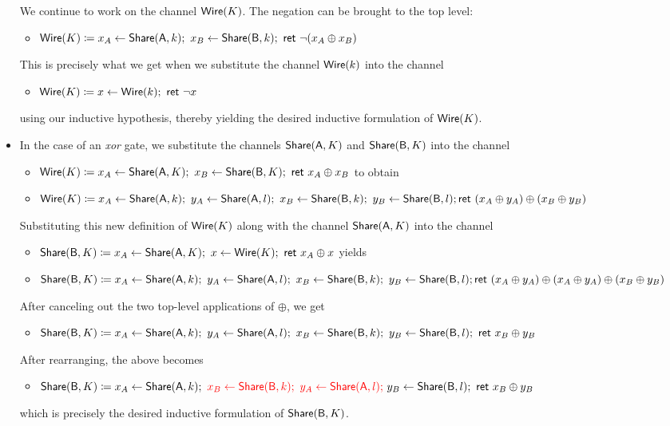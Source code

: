 \begin{itemize}
We continue to work on the channel $\mathsf{Wire}(K)$. The negation can be brought to the top level:
\begin{itemize}
\item $\mathsf{Wire}(K) \coloneqq x_A \leftarrow \mathsf{Share}(\mathsf{A},k); \ x_B \leftarrow \mathsf{Share}(\mathsf{B},k); \ \mathsf{ret} \ \neg (x_A \oplus x_B)$
\end{itemize}
This is precisely what we get when we substitute the channel $\mathsf{Wire}(k)$ into the channel
\begin{itemize}
\item $\mathsf{Wire}(K) \coloneqq x \leftarrow \mathsf{Wire}(k); \ \mathsf{ret} \ \neg x$
\end{itemize}
using our inductive hypothesis, thereby yielding the desired inductive formulation of $\mathsf{Wire}(K)$.
\item In the case of an \emph{xor} gate, we substitute the channels $\mathsf{Share}(\mathsf{A},K)$ and $\mathsf{Share}(\mathsf{B},K)$ into the channel
\begin{itemize}
\item $\mathsf{Wire}(K) \coloneqq x_A \leftarrow \mathsf{Share}(\mathsf{A},K); \ x_B \leftarrow \mathsf{Share}(\mathsf{B},K); \ \mathsf{ret} \ x_A \oplus x_B$ to obtain  
\item $\mathsf{Wire}(K) \coloneqq x_A \leftarrow \mathsf{Share}(\mathsf{A},k); \ y_A \leftarrow \mathsf{Share}(\mathsf{A},l); \ x_B \leftarrow \mathsf{Share}(\mathsf{B},k); \ y_B \leftarrow \mathsf{Share}(\mathsf{B},l); \\ \mathsf{ret} \ (x_A \oplus y_A) \oplus (x_B \oplus y_B)$
\end{itemize}
Substituting this new definition of $\mathsf{Wire}(K)$ along with the channel $\mathsf{Share}(\mathsf{A},K)$ into the channel
\begin{itemize}
\item $\mathsf{Share}(\mathsf{B},K) \coloneqq x_A \leftarrow \mathsf{Share}(\mathsf{A},K); \ x \leftarrow \mathsf{Wire}(K); \ \mathsf{ret} \ x_A \oplus x$ yields
\item $\mathsf{Share}(\mathsf{B},K) \coloneqq x_A \leftarrow \mathsf{Share}(\mathsf{A},k); \ y_A \leftarrow \mathsf{Share}(\mathsf{A},l); \ x_B \leftarrow \mathsf{Share}(\mathsf{B},k); \ y_B \leftarrow \mathsf{Share}(\mathsf{B},l); \\ \mathsf{ret} \ (x_A \oplus y_A) \oplus (x_A \oplus y_A) \oplus (x_B \oplus y_B)$
\end{itemize}
After canceling out the two top-level applications of $\oplus$, we get
\begin{itemize}
\item $\mathsf{Share}(\mathsf{B},K) \coloneqq x_A \leftarrow \mathsf{Share}(\mathsf{A},k); \ y_A \leftarrow \mathsf{Share}(\mathsf{A},l); \ x_B \leftarrow \mathsf{Share}(\mathsf{B},k); \ y_B \leftarrow \mathsf{Share}(\mathsf{B},l); \ \mathsf{ret} \ x_B \oplus y_B$
\end{itemize}
After rearranging, the above becomes
\begin{itemize}
\item $\mathsf{Share}(\mathsf{B},K) \coloneqq x_A \leftarrow \mathsf{Share}(\mathsf{A},k); \ {\color{red} x_B \leftarrow \mathsf{Share}(\mathsf{B},k); \ y_A \leftarrow \mathsf{Share}(\mathsf{A},l); \ } y_B \leftarrow \mathsf{Share}(\mathsf{B},l); \ \mathsf{ret} \ x_B \oplus y_B$
\end{itemize}
which is precisely the desired inductive formulation of $\mathsf{Share}(\mathsf{B},K)$.


\end{itemize}
